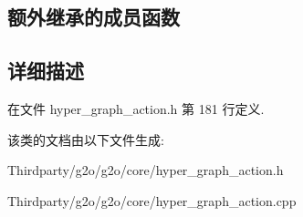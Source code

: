 \subsection*{额外继承的成员函数}


\subsection{详细描述}


在文件 hyper\-\_\-graph\-\_\-action.\-h 第 181 行定义.



该类的文档由以下文件生成\-:\begin{DoxyCompactItemize}
\item 
Thirdparty/g2o/g2o/core/hyper\-\_\-graph\-\_\-action.\-h\item 
Thirdparty/g2o/g2o/core/hyper\-\_\-graph\-\_\-action.\-cpp\end{DoxyCompactItemize}
